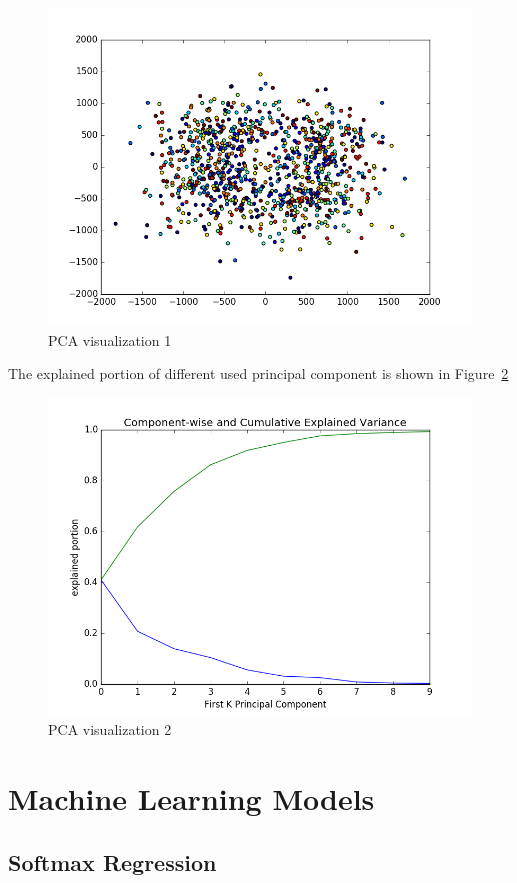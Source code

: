 \documentclass{article}
\begin{document}
\begin{figure}[!h]
\centering
\includegraphics[width=4.5in]{image/pca_scatter}
\caption{PCA visualization 1}
\label{PCA}
\end{figure}

The explained portion of different used principal component is shown in Figure~\ref{PCA2}

\begin{figure}[!h]
\centering
\includegraphics[width=4.5in]{image/pca_curve}
\caption{PCA visualization 2}
\label{PCA2}
\end{figure}

\section{Machine Learning Models}
\subsection{Softmax Regression}
\end{document}
